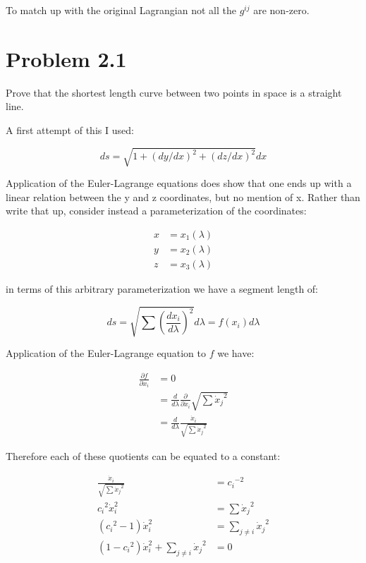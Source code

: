 \documentclass{article}
\newcommand{\xdot}[0]{\dot{x}}
\newcommand{\PD}[2]{\frac{\partial {#2}}{\partial {#1}}}
\begin{document}
To match up with the original Lagrangian not all the $g^{ij}$ are non-zero.

\section{ Problem 2.1 }

Prove that the shortest length curve between two points in space is a straight line.

A first attempt of this I used:

\begin{equation*}
ds = \sqrt{ 1 + (dy/dx)^2 + (dz/dx)^2 } dx
\end{equation*}

Application of the Euler-Lagrange equations does show that one ends up with a linear relation between the y and z coordinates, but no mention of x.  Rather than write that up, consider instead a parameterization of the coordinates:

\begin{align*}
x &= x_1(\lambda) \\
y &= x_2(\lambda) \\
z &= x_3(\lambda)
\end{align*}

in terms of this arbitrary parameterization we have a segment length of:

\begin{equation*}
ds = \sqrt{ \sum \left(\frac{d x_i}{d\lambda}\right)^2 } d \lambda = f\left(x_i\right) d\lambda
\end{equation*}

Application of the Euler-Lagrange equation to $f$ we have:

\begin{align*}
\PD{x_i}{f} 
&= 0 \\
&= \frac{d}{d\lambda} \PD{\xdot_i}{} \sqrt{ \sum {\xdot_j}^2 } \\
&= \frac{d}{d\lambda} \frac{ \xdot_i }{\sqrt{ \sum {\xdot_j}^2 }}
\end{align*}

Therefore each of these quotients can be equated to a constant:

\begin{align*}
\frac{ \xdot_i }{\sqrt{ \sum {\xdot_j}^2 }} &= {c_i}^{-2} \\
{c_i}^2 \xdot_i^2 &= \sum {\xdot_j}^2 \\
({c_i}^2 -1)\xdot_i^2 &= \sum_{j \ne i} {\xdot_j}^2 \\
(1 - {c_i}^2)\xdot_i^2 + \sum_{j \ne i} {\xdot_j}^2 &= 0 
\end{align*}
\end{document}
